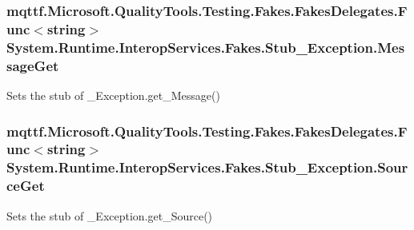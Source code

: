 \hypertarget{class_system_1_1_runtime_1_1_interop_services_1_1_fakes_1_1_stub___exception_a83da24e82deefcadc636bf399fbbac7b}{
\subsubsection[{Message\-Get}]{\setlength{\rightskip}{0pt plus 5cm}mqttf.\-Microsoft.\-Quality\-Tools.\-Testing.\-Fakes.\-Fakes\-Delegates.\-Func$<$string$>$ System.\-Runtime.\-Interop\-Services.\-Fakes.\-Stub\-\_\-\-Exception.\-Message\-Get}}\label{class_system_1_1_runtime_1_1_interop_services_1_1_fakes_1_1_stub___exception_a83da24e82deefcadc636bf399fbbac7b}


Sets the stub of \-\_\-\-Exception.\-get\-\_\-\-Message()

\hypertarget{class_system_1_1_runtime_1_1_interop_services_1_1_fakes_1_1_stub___exception_aba9a887008eb6804dcb4aef75fdbf97d}{
\subsubsection[{Source\-Get}]{\setlength{\rightskip}{0pt plus 5cm}mqttf.\-Microsoft.\-Quality\-Tools.\-Testing.\-Fakes.\-Fakes\-Delegates.\-Func$<$string$>$ System.\-Runtime.\-Interop\-Services.\-Fakes.\-Stub\-\_\-\-Exception.\-Source\-Get}}\label{class_system_1_1_runtime_1_1_interop_services_1_1_fakes_1_1_stub___exception_aba9a887008eb6804dcb4aef75fdbf97d}


Sets the stub of \-\_\-\-Exception.\-get\-\_\-\-Source()

